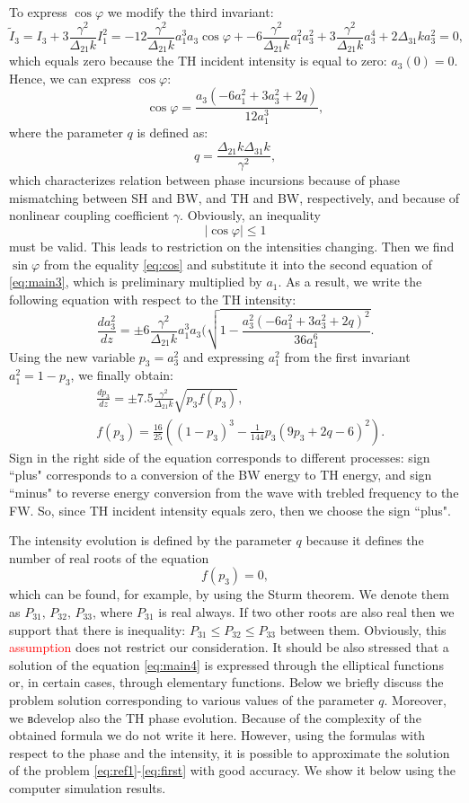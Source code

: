 \documentclass[a4paper, 12pt, onecolumn]{extarticle}
\begin{document}
To express \(\cos \varphi\) we modify the third invariant:
\[
\tilde{I}_3=I_3+3\frac{\gamma^2}{\Delta_{21}k}I_1^2=-12\frac{\gamma^2}{\Delta_{21}k}a_1^3a_3\cos\varphi+-6\frac{\gamma^2}{\Delta_{21}k}a_1^2a_3^2+3\frac{\gamma^2}{\Delta_{21}k}a_3^4+2\Delta_{31}ka_3^2=0,
\]
which equals zero because the TH incident intensity is equal to zero: \(a_3(0)=0\). Hence, we can express \(\cos \varphi\):
\begin{equation}
\label{eq:cos}
\cos\varphi=\frac{a_3(-6a_1^2+3a_3^2+2q)}{12a_1^3},
\end{equation}
where the parameter $q$ is defined as:
$$
q=\frac{\Delta_{21}k\Delta_{31}k}{\gamma^2},
$$
which characterizes relation between phase incursions because of phase mismatching between SH and BW, and TH and BW, respectively, and because of nonlinear coupling coefficient ${\gamma}$.
Obviously, an inequality 
\[
|\cos\varphi|\le1
\]
must be valid. This leads to restriction on the intensities changing.
Then we find \(\sin \varphi\) from the equality \eqref{eq:cos} and substitute it into the second equation of \eqref{eq:main3}, which is preliminary multiplied by \(a_1\). As a result, we write the following equation with respect to the TH intensity:
\[\frac{da_3^2}{dz}=\pm6\frac{\gamma^2}{\Delta_{21}k}a_1^3a_3(\sqrt{1-\frac{a_3^2(-6a_1^2+3a_3^2+2q)^2}{36a_1^6}}.\]
Using the new variable \(p_3=a_3^2\) and expressing \(a_1^2\) from the first invariant \(a_1^2=1-p_3\), we finally obtain:
\begin{equation}
\label{eq:main4}
\begin{aligned}
&\frac{dp_3}{dz}=\pm7.5\frac{\gamma^2}{\Delta_{21}k}\sqrt{p_3f(p_3)},\\
&f(p_3)=\frac{16}{25}((1-p_3)^3-\frac{1}{144}p_3(9p_3+2q-6)^2).
\end{aligned}
\end{equation}
Sign in the right side of the equation corresponds to different processes: sign ``plus" corresponds to a conversion of the BW energy to TH energy, and sign ``minus" to reverse energy conversion from the wave with trebled frequency to the FW. So, since TH incident intensity equals zero, then we choose the sign ``plus".

The intensity evolution is defined by the parameter $q$ because it defines the number of real roots of the equation
$$
f(p_3)=0,
$$
which can be found, for example, by using the Sturm theorem. We  denote them as
$P_{31},\,P_{32},\,P_{33}$, where $P_{31}$ is  real always. If two other roots are also real then we support that there is inequality:   $P_{31}\le P_{32}\le P_{33}$ between them. Obviously, this   \textcolor{red}{assumption} does not restrict our consideration.
It should be also stressed that a solution of the equation \eqref{eq:main4} is expressed through the elliptical functions or, in certain cases, through elementary functions. Below we briefly discuss the problem  solution corresponding to various values of the parameter $q$.
Moreover, we вdevelop also the TH phase evolution. Because of the complexity of the obtained formula we do not write it here. However, using the formulas with respect to the phase and the intensity, it is possible to approximate the solution of the problem \eqref{eq:ref1}-\eqref{eq:first} with good accuracy. We show it below using the computer simulation results.
\end{document}
